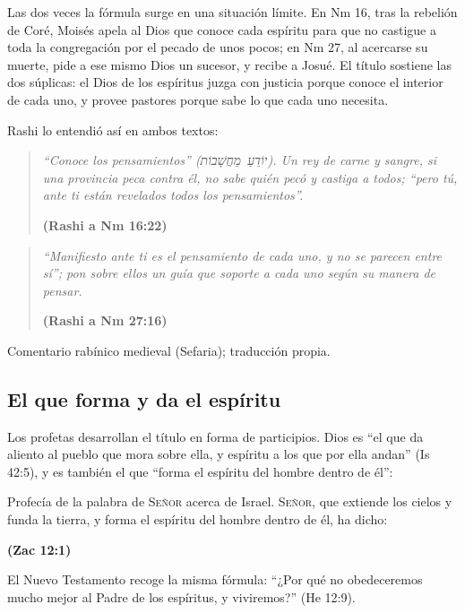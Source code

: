 \documentclass[11pt,letterpaper]{article}
\newcommand{\heb}[1]{\mbox{\foreignlanguage{hebrew}{#1}}}
\newcommand{\SENOR}{\textsc{Señor}}
\newcommand{\fuente}[1]{\par\hfill{\upshape\bfseries\small\textcolor{azul}{#1}}}
\begin{document}
Las dos veces la fórmula surge en una situación límite. En Nm 16, tras la rebelión de Coré, Moisés apela al Dios que conoce cada espíritu para que no castigue a toda la congregación por el pecado de unos pocos; en Nm 27, al acercarse su muerte, pide a ese mismo Dios un sucesor, y recibe a Josué. El título sostiene las dos súplicas: el Dios de los espíritus juzga con justicia porque conoce el interior de cada uno, y provee pastores porque sabe lo que cada uno necesita.

Rashi lo entendió así en ambos textos:

\begin{quote}\itshape
``Conoce los pensamientos'' (\heb{יוֹדֵעַ מַחֲשָׁבוֹת}). Un rey de carne y sangre, si una provincia peca contra él, no sabe quién pecó y castiga a todos; ``pero tú, ante ti están revelados todos los pensamientos''.\par\hfill{\upshape\small\bfseries\textcolor{azul}{(Rashi a Nm 16:22)}}
\end{quote}

\begin{quote}\itshape
``Manifiesto ante ti es el pensamiento de cada uno, y no se parecen entre sí''; pon sobre ellos un guía que soporte a cada uno según su manera de pensar.\par\hfill{\upshape\small\bfseries\textcolor{azul}{(Rashi a Nm 27:16)}}
\end{quote}

\begin{nota}[Precisión]
Comentario rabínico medieval (Sefaria); traducción propia.
\end{nota}

\subsection{El que forma y da el espíritu}

Los profetas desarrollan el título en forma de participios. Dios es ``el que da aliento al pueblo que mora sobre ella, y espíritu a los que por ella andan'' (Is 42:5), y es también el que ``forma el espíritu del hombre dentro de él'':

\begin{cita}Profecía de la palabra de \SENOR{} acerca de Israel. \SENOR, que extiende los cielos y funda la tierra, y forma el espíritu del hombre dentro de él, ha dicho:\fuente{(Zac 12:1)}\end{cita}

El Nuevo Testamento recoge la misma fórmula: ``¿Por qué no obedeceremos mucho mejor al Padre de los espíritus, y viviremos?'' (He 12:9).
\end{document}
